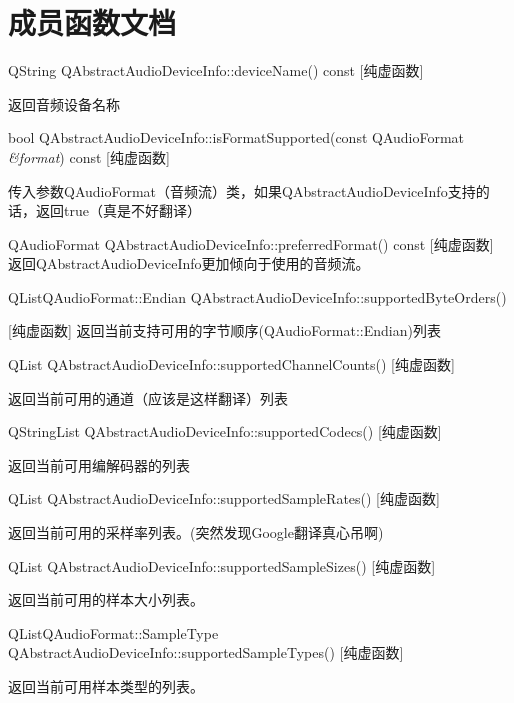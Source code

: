 \section{成员函数文档}

QString QAbstractAudioDeviceInfo::deviceName() const [纯虚函数] 

返回音频设备名称

bool QAbstractAudioDeviceInfo::isFormatSupported(const QAudioFormat \emph{\&format}) const [纯虚函数] 

传入参数QAudioFormat（音频流）类，如果QAbstractAudioDeviceInfo支持的话，返回true（真是不好翻译）

QAudioFormat QAbstractAudioDeviceInfo::preferredFormat() const [纯虚函数]
 返回QAbstractAudioDeviceInfo更加倾向于使用的音频流。

QListQAudioFormat::Endian QAbstractAudioDeviceInfo::supportedByteOrders() 

[纯虚函数] 返回当前支持可用的字节顺序(QAudioFormat::Endian)列表

QList QAbstractAudioDeviceInfo::supportedChannelCounts() [纯虚函数] 

返回当前可用的通道（应该是这样翻译）列表

QStringList QAbstractAudioDeviceInfo::supportedCodecs() [纯虚函数] 

返回当前可用编解码器的列表

QList QAbstractAudioDeviceInfo::supportedSampleRates() [纯虚函数] 

返回当前可用的采样率列表。(突然发现Google翻译真心吊啊)

QList QAbstractAudioDeviceInfo::supportedSampleSizes() [纯虚函数] 

返回当前可用的样本大小列表。

QListQAudioFormat::SampleType QAbstractAudioDeviceInfo::supportedSampleTypes() [纯虚函数] 

返回当前可用样本类型的列表。